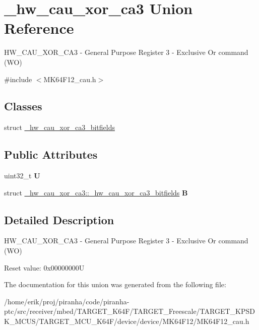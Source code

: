 \hypertarget{union__hw__cau__xor__ca3}{}\section{\+\_\+hw\+\_\+cau\+\_\+xor\+\_\+ca3 Union Reference}
\label{union__hw__cau__xor__ca3}


H\+W\+\_\+\+C\+A\+U\+\_\+\+X\+O\+R\+\_\+\+C\+A3 -\/ General Purpose Register 3 -\/ Exclusive Or command (WO)  




{\ttfamily \#include $<$M\+K64\+F12\+\_\+cau.\+h$>$}

\subsection*{Classes}
\begin{DoxyCompactItemize}
\item 
struct \hyperlink{struct__hw__cau__xor__ca3_1_1__hw__cau__xor__ca3__bitfields}{\+\_\+hw\+\_\+cau\+\_\+xor\+\_\+ca3\+\_\+bitfields}
\end{DoxyCompactItemize}
\subsection*{Public Attributes}
\begin{DoxyCompactItemize}
\item 
uint32\+\_\+t {\bfseries U}\hypertarget{union__hw__cau__xor__ca3_ac21aec86eb982327b2be581eb1755531}{}\label{union__hw__cau__xor__ca3_ac21aec86eb982327b2be581eb1755531}

\item 
struct \hyperlink{struct__hw__cau__xor__ca3_1_1__hw__cau__xor__ca3__bitfields}{\+\_\+hw\+\_\+cau\+\_\+xor\+\_\+ca3\+::\+\_\+hw\+\_\+cau\+\_\+xor\+\_\+ca3\+\_\+bitfields} {\bfseries B}\hypertarget{union__hw__cau__xor__ca3_a5bd06bc36fed83c4620992c749e95178}{}\label{union__hw__cau__xor__ca3_a5bd06bc36fed83c4620992c749e95178}

\end{DoxyCompactItemize}


\subsection{Detailed Description}
H\+W\+\_\+\+C\+A\+U\+\_\+\+X\+O\+R\+\_\+\+C\+A3 -\/ General Purpose Register 3 -\/ Exclusive Or command (WO) 

Reset value\+: 0x00000000U 

The documentation for this union was generated from the following file\+:\begin{DoxyCompactItemize}
\item 
/home/erik/proj/piranha/code/piranha-\/ptc/src/receiver/mbed/\+T\+A\+R\+G\+E\+T\+\_\+\+K64\+F/\+T\+A\+R\+G\+E\+T\+\_\+\+Freescale/\+T\+A\+R\+G\+E\+T\+\_\+\+K\+P\+S\+D\+K\+\_\+\+M\+C\+U\+S/\+T\+A\+R\+G\+E\+T\+\_\+\+M\+C\+U\+\_\+\+K64\+F/device/device/\+M\+K64\+F12/M\+K64\+F12\+\_\+cau.\+h\end{DoxyCompactItemize}
